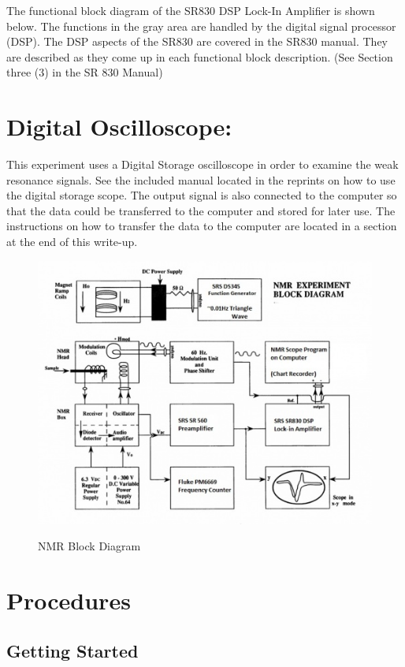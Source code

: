 \documentclass{../lab}
\begin{document}
The functional block diagram of the SR830 DSP Lock-In Amplifier is shown below. The functions in the gray area are handled by the digital signal processor (DSP). The DSP aspects of the SR830 are covered in the SR830 manual. They are described as they come up in each functional block description. (See Section three (3) in the SR 830 Manual)

\section{Digital Oscilloscope:}

This experiment uses a Digital Storage oscilloscope in order to examine the weak resonance signals. See the included manual located in the reprints on how to use the digital storage scope. The output signal is also connected to the computer so that the data could be transferred to the computer and stored for later use. The instructions on how to transfer the data to the computer are located in a section at the end of this write-up.

\begin{figure}[h]
    \centering
    \href{http://experimentationlab.berkeley.edu/sites/default/files/images/500px-NMRblockdiagram.jpg}{\includegraphics[width=0.6\linewidth]{images/500px-NMRblockdiagram.jpg}}
    \caption{NMR Block Diagram}
    \label{fig:500px-NMRblockdiagram}
\end{figure}

\section{Procedures}

\subsection{Getting Started}
\end{document}
